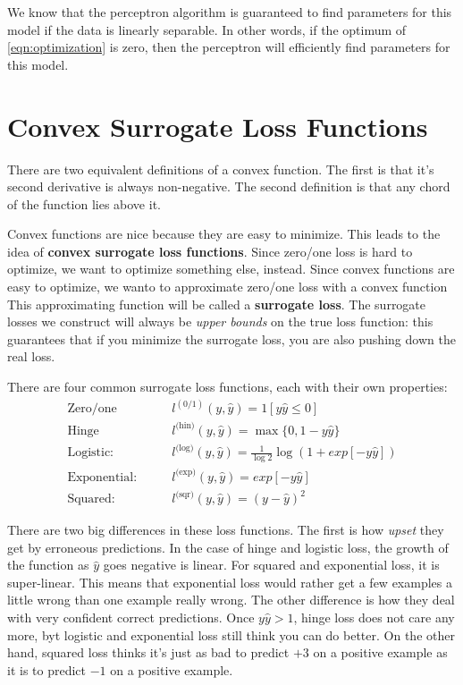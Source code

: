 We know that the perceptron algorithm is guaranteed to find parameters for this model if the data is linearly separable. In other words, if the optimum of \ref{eqn:optimization} is zero, then the perceptron will efficiently find parameters for this model.

\section{Convex Surrogate Loss Functions}
There are two equivalent definitions of a convex function. The first is that it's second derivative is always non-negative. The second definition is that any chord of the function lies above it.

Convex functions are nice because they are easy to minimize. This leads to the idea of \textbf{convex surrogate loss functions}. Since zero/one loss is hard to optimize, we want to optimize something else, instead. Since convex functions are easy to optimize, we wanto to approximate zero/one loss with a convex function This approximating function will be called a \textbf{surrogate loss}. The surrogate losses we construct will always be \emph{upper bounds} on the true loss function: this guarantees that if you minimize the surrogate loss, you are also pushing down the real loss.

There are four common surrogate loss functions, each with their own properties:
\begin{align}
    \text{Zero/one}& \qquad l^{(0/1)}(y,\hat{y}) = 1[y\hat{y} \leq 0] \\
    \text{Hinge}& \qquad l^\text{(hin)}(y,\hat{y}) = \max\{0,1-y\hat{y}\} \\
    \text{Logistic:}& \qquad l^\text{(log)}(y,\hat{y}) = \frac 1 {\log 2} \log (1 + exp [-y\hat{y}]) \\
    \text{Exponential:}& \qquad l^\text{(exp)}(y,\hat{y}) = exp[-y\hat{y}] \\
    \text{Squared:}& \qquad l^\text{(sqr)}(y,\hat{y}) = (y-\hat{y})^2
\end{align}

There are two big differences in these loss functions. The first is how \emph{upset} they get by erroneous predictions. In the case of hinge and logistic loss, the growth of the function as \(\hat{y}\) goes negative is linear. For squared and exponential loss, it is super-linear. This means that exponential loss would rather get a few examples a little wrong than one example really wrong.
The other difference is how they deal with very confident correct predictions. Once \(y\hat{y}>1\), hinge loss does not care any more, byt logistic and exponential loss still think you can do better. On the other hand, squared loss thinks it's just as bad to predict \(+3\) on a positive example as it is to predict \(-1\) on a positive example.


